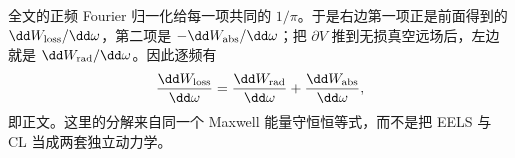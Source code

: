 \begin{derivation}
全文的正频 Fourier 归一化给每一项共同的 $1/\pi$。于是右边第一项正是前面得到的 $\dd W_{\rm loss}/\dd\omega$，第二项是 $-\dd W_{\rm abs}/\dd\omega$；把 $\partial V$ 推到无损真空远场后，左边就是 $\dd W_{\rm rad}/\dd\omega$。因此逐频有
\begin{equation*}
 \frac{\dd W_{\rm loss}}{\dd\omega}
 =\frac{\dd W_{\rm rad}}{\dd\omega}
 +\frac{\dd W_{\rm abs}}{\dd\omega},
\end{equation*}
即正文。这里的分解来自同一个 Maxwell 能量守恒恒等式，而不是把 EELS 与 CL 当成两套独立动力学。
\end{derivation}


